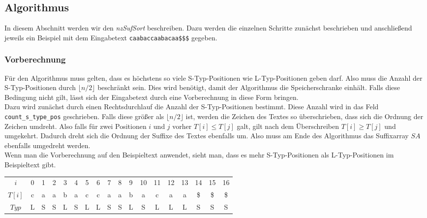 \subsection{Algorithmus}

In diesem Abschnitt werden wir den \emph{nzSufSort} beschreiben. Dazu werden die einzelnen Schritte zunächst beschrieben und anschließend jeweils ein Beispiel mit dem Eingabetext \texttt{caabaccaabacaa\$\$\$} gegeben.

\subsubsection{Vorberechnung}

Für den Algorithmus muss gelten, dass es höchstens so viele S-Typ-Positionen wie L-Typ-Positionen geben darf. Also muss die Anzahl der S-Typ-Positionen durch $\lfloor n/2 \rfloor$ beschränkt sein. Dies wird benötigt, damit der Algorithmus die Speicherschranke einhält. Falls diese Bedingung nicht gilt, lässt sich der Eingabetext durch eine Vorberechnung in diese Form bringen. \\
Dazu wird zunächst durch einen Rechtsdurchlauf die Anzahl der S-Typ-Positionen bestimmt. Diese Anzahl wird in das Feld \texttt{count\_s\_type\_pos} geschrieben. Falls diese größer als $\lfloor n/2 \rfloor$ ist, werden die Zeichen des Textes so überschrieben, dass sich die Ordnung der Zeichen umdreht. Also falls für zwei Positionen $i$ und $j$ vorher $T[i] \le T[j]$ galt, gilt nach dem Überschreiben $T[i] \ge T[j]$ und umgekehrt. Dadurch dreht sich die Ordnung der Suffixe des Textes ebenfalls um. Also muss am Ende des Algorithmus das Suffixarray $SA$ ebenfalls umgedreht werden. \\

Wenn man die Vorberechnung auf den Beispieltext anwendet, sieht man, dass es mehr S-Typ-Positionen als L-Typ-Positionen im Beispieltext gibt.

\begin{table}[H]
	\centering
	\begin{tabular}{c| c c c c c c c c c c c c c c c c c}
		$i$ & 0 & 1 & 2 & 3 & 4 & 5 & 6 & 7 & 8 & 9 & 10 & 11 & 12 & 13 & 14 & 15 & 16 \\
		$T[i]$ & c & a & a & b & a & c & c & a & a & b & a & c & a & a & \$ & \$ & \$ \\
		$Typ$ & L & S & S & L & S & L & L & S & S & L & S & L & L & L & S & S & S
	\end{tabular}
\end{table}


